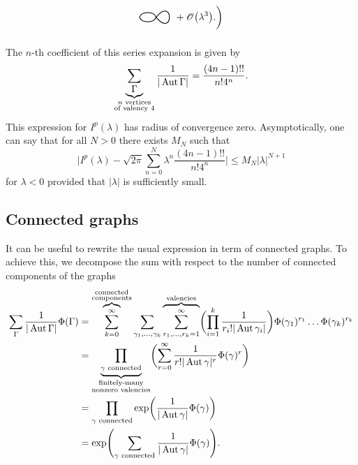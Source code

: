 \begin{example}
\begin{align*}
\begin{tikzpicture}[scale=2, baseline=-1mm]
        \draw[thick] (.3, 0) to[out=-50, in=50, loop] (.3, 0);
        \draw[thick] (0, 0) to[out=70, in=110] (.3, 0);
        \draw[thick] (0, 0) to[out=-70, in=-110] (.3, 0);
      \end{tikzpicture}
      + \Oscr \bigl(\lambda^3\bigr).
    \biggr) 
  \end{align*}
  The $n$-th coefficient of this series expansion is given by
  \begin{equation*}
    \sum_{\underbrace{\Gamma}_{\substack{n\text{ vertices} \\ \text{of valency } 4}}} \frac{1}{|\operatorname{Aut} \Gamma|}
    = \frac{(4n - 1)!!}{n! 4^n}.
  \end{equation*}
  This expression for $I^p (\lambda)$ has radius of convergence zero. Asymptotically, one can say that for all $N > 0$ there exists $M_N$ such that
  \begin{equation*}
    \biggl| I^p(\lambda) - \sqrt{2 \pi} \sum_{n=0}^N \lambda^n \frac{(4n - 1)!!}{n! 4^n} \biggr|
    \leq M_N |\lambda|^{N + 1}
  \end{equation*}
  for $\lambda < 0$ provided that $|\lambda|$ is sufficiently small.
\end{example}

\subsection{Connected graphs}

It can be useful to rewrite the usual expression in term of connected graphs. To achieve this, we decompose the sum with respect to the number of connected components of the graphs
\begin{align*}
  \sum_{\Gamma} \frac{1}{|\operatorname{Aut} \Gamma|} \Phi(\Gamma)
  &= \overbrace{\sum_{k = 0}^\infty}^{\substack{\text{connected}\\ \text{components}}}
  \sum_{\gamma_1, \dots, \gamma_k}
  \overbrace{\sum_{r_1, \dots, r_k = 1}^\infty}^{\text{valencies}}
  \biggl( \prod_{i=1}^k \frac{1}{r_i! |\operatorname{Aut} \gamma_i|} \biggr) \Phi(\gamma_1)^{r_1} \dots \Phi(\gamma_k)^{r_k} \\
  &= \underbrace{\prod_{\gamma \text{ connected}}}_{\substack{\text{finitely-many} \\ \text{nonzero valencies}}}
    \biggl( \sum_{r=0}^\infty \frac{1}{r! |\operatorname{Aut} \gamma|^r} \Phi(\gamma)^r \biggr) \\
  &= \prod_{\gamma \text{ connected}} \exp \biggl( \frac{1}{|\operatorname{Aut} \gamma|} \Phi(\gamma) \biggr) \\
  &= \exp \Biggl( \sum_{\gamma \text{ connected}} \frac{1}{|\operatorname{Aut} \gamma|} \Phi(\gamma) \Biggr).
\end{align*}
